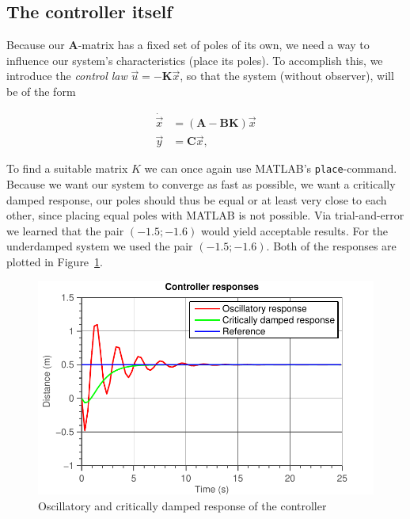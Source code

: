 \documentclass[11pt,titlepage]{report}
\begin{document}
\subsection{The controller itself}
Because our $\mathbf{A}$-matrix has a fixed set of poles of its own, we need a way to influence our system's characteristics (place its poles). To accomplish this, we introduce the \textit{control law} $\vec{u} = -\mathbf{K}\vec{x}$, so that the system (without observer), will be of the form

\begin{equation*}
	\begin{split}
		\dot{\vec{x}} &= (\mathbf{A}-\mathbf{B}\mathbf{K})\vec{x} \\
		\vec{y} &= \mathbf{C}\vec{x},
	\end{split}
\end{equation*}

To find a suitable matrix $K$ we can once again use MATLAB's \texttt{place}-command.
Because we want our system to converge as fast as possible, we want a critically damped response, our poles should thus be equal or at least very close to each other, since placing equal poles with MATLAB is not possible. Via trial-and-error we learned that the pair $(-1.5; -1.6)$ would yield acceptable results.
For the underdamped system we used the pair $(-1.5; -1.6)$. Both of the responses are plotted in Figure~\ref{fig:ass2-controller-response}. %

\begin{figure}[H]
	\begin{center}
		\includegraphics[width=0.7\linewidth]{resource/controller.pdf}
	\end{center}
	\caption{Oscillatory and critically damped response of the controller}
	\label{fig:ass2-controller-response}
\end{figure}

\end{document}
